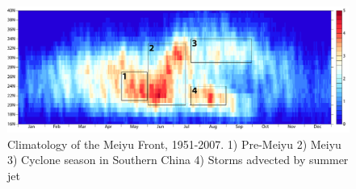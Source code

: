 \documentclass[draft,grl]{AGUTeX}
\begin{document}
\begin{article}
%
%
%
%
%
%
%
%
%




%
%
\end{article}
%
%
%
%
%
%

\begin{figure}
\noindent\includegraphics[width=36pc]{fig1meiyu_climo.pdf}
\caption{Climatology of the Meiyu Front, 1951-2007. 1) Pre-Meiyu 2) Meiyu 3) Cyclone season in Southern China 4) Storms advected by summer jet}
\label{figure_label}
\end{figure}
\end{document}
